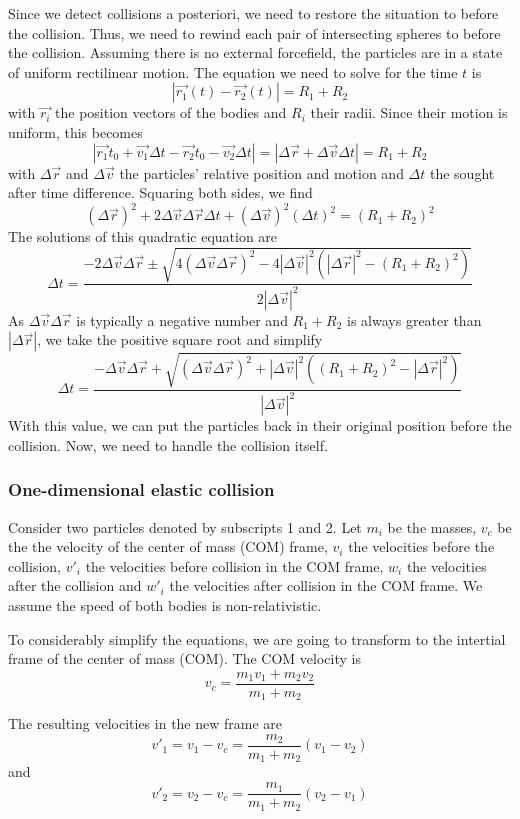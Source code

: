 Since we detect collisions a posteriori, we need to restore the situation to 
before the collision. Thus, we need to rewind each pair of intersecting spheres 
to before the collision. Assuming there is no external forcefield, the 
particles are in a state of uniform rectilinear motion. The equation we need to 
solve for the time $t$ is
$$
|\vec{r_1}(t) - \vec{r_2}(t)| = R_1 + R_2
$$
with $\vec{r_i}$ the position vectors of the bodies and $R_i$ their radii.  
Since their motion is uniform, this becomes
$$
|\vec{r_1}{t_0} + \vec{v_1}\Delta t - \vec{r_2}{t_0} - \vec{v_2}\Delta t| = | 
\Delta\vec{r} + \Delta\vec{v} \Delta t | = R_1 + R_2
$$
with $\Delta\vec{r}$ and $\Delta\vec{v}$ the particles' relative position and 
motion and $\Delta t$ the sought after time difference. Squaring both sides, we 
find
$$
(\Delta\vec{r})^2 + 2\Delta\vec{v}\Delta\vec{r}\Delta t + 
(\Delta\vec{v})^2(\Delta t)^2 = (R_1 + R_2)^2
$$
The solutions of this quadratic equation are
$$
\Delta t = \frac{-2\Delta\vec{v}\Delta\vec{r}
\pm \sqrt{4( \Delta\vec{v}\Delta\vec{r})^2 -
4|\Delta\vec{v}|^2 \left( |\Delta\vec{r}|^2 - (R_1 + R_2)^2 \right) }}
{2|\Delta\vec{v}|^2}
$$
As $\Delta\vec{v}\Delta\vec{r}$ is typically a negative number and $R_1 + R_2$ 
is always greater than $|\Delta\vec{r}|$, we take the positive square root and 
simplify
$$
\Delta t=\frac{-\Delta\vec{v}\Delta\vec{r} + 
\sqrt{(\Delta\vec{v}\Delta\vec{r})^2 + |\Delta\vec{v}|^2
((R_1+R_2)^2 -|\Delta\vec{r}|^2)}}
{|\Delta\vec{v}|^2}
$$
With this value, we can put the particles back in their original position 
before the collision. Now, we need to handle the collision itself.

\subsubsection{One-dimensional elastic collision}

Consider two particles denoted by subscripts 1 and 2.  Let $m_i$ be the masses, 
$v_c$ be the the velocity of the center of mass (COM) frame, $v_i$ the 
velocities before the collision, $v'_i$ the velocities before collision in the 
COM frame, $w_i$ the velocities after the collision and $w'_i$ the velocities 
after collision in the COM frame.  We assume the speed of both bodies is 
non-relativistic. 

To considerably simplify the equations, we are going to transform to the 
intertial frame of the center of mass (COM). The COM velocity is
$$
v_c = \frac{m_1 v_1 + m_2 v_2}{m_1 + m_2}
$$

The resulting velocities in the new frame are
$$
v'_1 = v_1 - v_c = \frac{m_2}{m_1+m_2}(v_1-v_2)
$$
and
$$
v'_2 = v_2 - v_c = \frac{m_1}{m_1+m_2}(v_2-v_1)
$$


